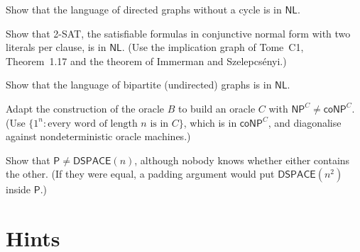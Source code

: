 \begin{exercise}[$\star$]\label{ex:dag}
Show that the language of directed graphs without a cycle is in $\mathsf{NL}$.
\end{exercise}

\begin{exercise}[$\star\star$]\label{ex:twosatnl}
Show that 2-SAT, the satisfiable formulas in conjunctive normal form with two literals per clause, is in $\mathsf{NL}$. (Use the implication graph of Tome~C1, Theorem~1.17 and the theorem of Immerman and Szelepcsényi.)
\end{exercise}

\begin{exercise}[$\star\star$]\label{ex:bipartite}
Show that the language of bipartite (undirected) graphs is in $\mathsf{NL}$.
\end{exercise}

\begin{exercise}[$\star\star$]\label{ex:bgsconp}
Adapt the construction of the oracle $B$ to build an oracle $C$ with $\mathsf{NP}^C\ne\mathsf{coNP}^C$. (Use $\{1^n:\text{every word of length }n\text{ is in }C\}$, which is in $\mathsf{coNP}^C$, and diagonalise against nondeterministic oracle machines.)
\end{exercise}

\begin{exercise}[$\star\star\star$]\label{ex:pnotlinspace}
Show that $\mathsf P\ne\mathsf{DSPACE}(n)$, although nobody knows whether either contains the other. (If they were equal, a padding argument would put $\mathsf{DSPACE}(n^2)$ inside $\mathsf P$.)
\end{exercise}

\section{Hints}

